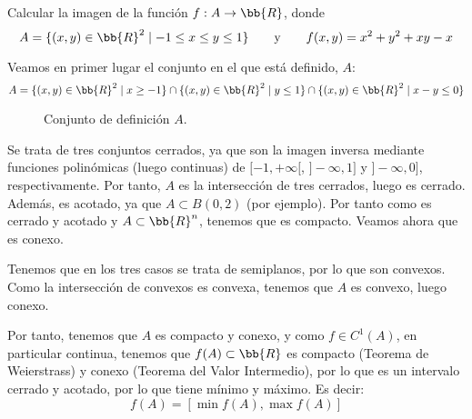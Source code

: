 \begin{ejercicio}
    Calcular la imagen de la función $f: A \to \bb{R}$, donde
    \begin{equation*}
        A = \{(x,y)\in \bb{R}^2\mid -1 \leq x \leq y \leq 1\}
        \qquad \text{y} \qquad
        f(x,y)=x^2+y^2 +xy -x
    \end{equation*}

    Veamos en primer lugar el conjunto en el que está definido, $A$:
    \begin{equation*}
        A = \{(x,y)\in \bb{R}^2\mid x\geq -1\} \cap \{(x,y)\in \bb{R}^2\mid y\leq 1\} \cap \{(x,y)\in \bb{R}^2\mid x-y \leq 0\}
    \end{equation*}

    \begin{figure}[H]
        \centering
        \caption{Conjunto de definición $A$.}
    \end{figure}

    Se trata de tres conjuntos cerrados, ya que son la imagen inversa mediante funciones polinómicas (luego continuas) de $[-1,+\infty[$, $]-\infty,1]$ y $]-\infty,0]$, respectivamente.
    Por tanto, $A$ es la intersección de tres cerrados, luego es cerrado. Además, es acotado, ya que $A\subset B(0, 2)$ (por ejemplo). Por tanto como es cerrado y acotado y $A\subset \bb{R}^n$, tenemos que es compacto. Veamos ahora que es conexo.

    Tenemos que en los tres casos se trata de semiplanos, por lo que son convexos. Como
    la intersección de convexos es convexa, tenemos que $A$ es convexo, luego conexo.

    Por tanto, tenemos que $A$ es compacto y conexo, y como $f\in C^1(A)$, en particular continua, tenemos que $f(A)\subset \bb{R}$ es compacto (Teorema de Weierstrass) y conexo (Teorema del Valor Intermedio), por lo que es un intervalo cerrado y acotado, por lo que tiene mínimo y máximo. Es decir:
    \begin{equation*}
        f(A) = [\min f(A), \max f(A)]
    \end{equation*}


\end{ejercicio}
